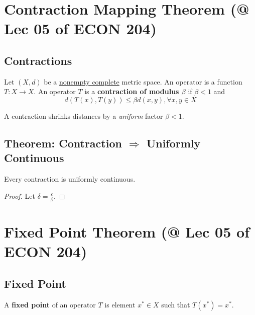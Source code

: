 \documentclass[11pt]{elegantbook}
\begin{document}
\section{Contraction Mapping Theorem \small{(@ Lec 05 of ECON 204)}}
\subsection{Contractions}
\begin{definition}
    \normalfont
    Let $(X, d)$ be a \underline{nonempty complete} metric space. An operator is a function $T : X \rightarrow X$. An operator $T$ is a \textbf{contraction of modulus $\beta$} if $\beta < 1$ and $$d(T(x), T(y)) \leq \beta d(x, y), \forall x,y\in X$$
\end{definition}
A contraction shrinks distances by a \textit{uniform} factor $\beta < 1$.

\subsection{Theorem: Contraction $\Rightarrow$ Uniformly Continuous}
\begin{theorem}
    Every contraction is uniformly continuous.
\end{theorem}
\begin{proof}
    Let $\delta=\frac{\varepsilon}{\beta}$.
\end{proof}


\section{Fixed Point Theorem \small{(@ Lec 05 of ECON 204)}}
\subsection{Fixed Point}
\begin{definition}
    \normalfont
    A \textbf{fixed point} of an operator $T$ is element $x^*\in X$ such that $T(x^*)=x^*$.
\end{definition}
\end{document}
